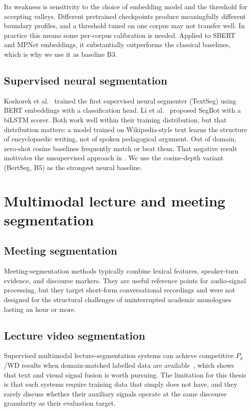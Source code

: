 Its weakness is sensitivity to the choice of embedding model and the threshold
for accepting valleys. Different pretrained checkpoints produce meaningfully
different boundary profiles, and a threshold tuned on one corpus may not
transfer well. In practice this means some per-corpus calibration is needed.
Applied to SBERT and MPNet embeddings, it substantially outperforms the
classical baselines, which is why we use it as baseline B3.

\subsection{Supervised neural segmentation}

Koshorek et al.~\cite{koshorek2018text} trained the first supervised neural
segmenter (TextSeg) using BERT embeddings with a classification head.
Li et al.~\cite{li2018segbot} proposed SegBot with a biLSTM scorer.
Both work well within their training distribution, but that distribution
matters: a model trained on Wikipedia-style text learns the structure of
encyclopaedic writing, not of spoken pedagogical argument. Out of domain,
zero-shot cosine baselines frequently match or beat them. That negative result
motivates the unsupervised approach in \lecseg{}. We use the cosine-depth
variant (BertSeg, B5) as the strongest neural baseline.

\section{Multimodal lecture and meeting segmentation}
\label{sec:multimodal_lit}

\subsection{Meeting segmentation}

Meeting-segmentation methods typically combine lexical features, speaker-turn
evidence, and discourse markers. They are useful reference points for
audio-signal processing, but they target short-form conversational recordings
and were not designed for the structural challenges of uninterrupted academic
monologues lasting an hour or more.

\subsection{Lecture video segmentation}

Supervised multimodal lecture-segmentation systems can achieve competitive
$P_k$/WD results when domain-matched labelled data are
available~\cite{yu2024_multimodal}, which shows that text and visual signal
fusion is worth pursuing. The limitation for this thesis is that such systems
require training data that \lecseg{} simply does not have, and they rarely
discuss whether their auxiliary signals operate at the same discourse
granularity as their evaluation target.


